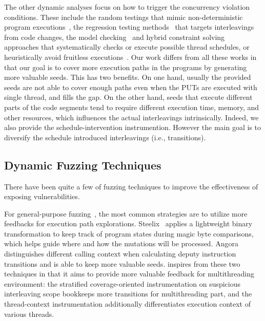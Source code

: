The other dynamic analyses focus on how to trigger the concurrency violation conditions. These include the random testings that mimic non-deterministic program executions~\cite{Sen07,Sen08,JoshiPSN09,ParkS08,CaiC12}, the regression testing methods~\cite{TerragniCZ15,YuHW18} that targets interleavings from code changes, the model checking~\cite{FlanaganG05,ZaksJ08,YangCGK07,yang2008inspect} and hybrid constraint solving~\cite{pldi14_maxmodel,Huang15,icse18_ufo} approaches that systematically checks or execute possible thread schedules, or heuristically avoid fruitless executions~\cite{GuoKWYG15,GuoKW16}. Our work differs from all these works in that our goal is to cover more execution paths in the programs by generating more valuable seeds. This has two benefits. On one hand, usually the provided seeds are not able to cover enough paths even when the PUTs are executed with single thread, and \mtfuzz fills the gap. On the other hand, seeds that execute different parts of the code segments tend to require different execution time, memory, and other resources, which influences the actual interleavings intrinsically. Indeed, we also provide the schedule-intervention instrumention. However the main goal is to diversify the schedule introduced interleavings (i.e., transitions).

\subsection{Dynamic Fuzzing Techniques}
There have been quite a few of fuzzing techniques to improve the effectiveness of exposing vulnerabilities.

For general-purpose fuzzing~\cite{Bohme:2016:CGF,LiCMLLT17,CollAFL,Angora,FairFuzz,redqueen}, the most common strategies are to utilize more feedbacks for execution path explorations. Steelix~\cite{LiCMLLT17} applies a lightweight binary transformation to keep track of program states during magic byte comparisons, which helps guide where and how the mutations will be processed. Angora~\cite{Angora} distinguishes different calling context when calculating deputy instruction transitions and is able to keep more valuable seeds. \mtfuzz inspires from these two techniques in that it aims to provide more valuable feedback for multithreading environment: the stratified coverage-oriented instrumentation on suspicious interleaving scope \mtiscope bookkeeps more transitions for multithreading part, and the thread-context instrumentation additionally differentiates execution context of various threads.

